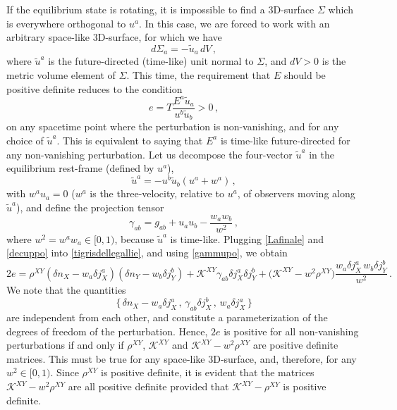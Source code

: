 \documentclass[a4paper, amsfonts, amssymb, amsmath, reprint, showkeys, nofootinbib, twoside, onecolumn,notitlepage]{revtex4-1}
\theoremstyle{definition}
\theoremstyle{theorem}
\begin{document}
If the equilibrium state is rotating, it is impossible to find a 3D-surface $\Sigma$ which is everywhere orthogonal to $u^a$. In this case, we are forced to work with an arbitrary space-like 3D-surface, for which we have
\begin{equation}
d\Sigma_a = -\tilde{u}_a \, dV \, ,
\end{equation}
where $\tilde{u}^a$ is the future-directed (time-like) unit normal to $\Sigma$, and $dV>0$ is the metric volume element of $\Sigma$. This time, the requirement that $E$ should be positive definite reduces to the condition
\begin{equation}\label{tigrisdellegallie}
e = T \dfrac{E^a \tilde{u}_a}{u^b \tilde{u}_b}  >0 \, ,
\end{equation}
on any spacetime point where the perturbation is non-vanishing, and for any choice of $\tilde{u}^a$. This is equivalent to saying that $E^a$ is time-like future-directed for any non-vanishing perturbation. Let us decompose the four-vector $\tilde{u}^a$ in the equilibrium rest-frame (defined by $u^a$),
\begin{equation}\label{decuppo}
\tilde{u}^a = -u^b\tilde{u}_b (u^a+w^a) \, ,
\end{equation}
with $w^a u_a=0$ ($w^a$ is the three-velocity, relative to $u^a$, of observers moving along $\tilde{u}^a$), and define the projection tensor
\begin{equation}\label{gammupo}
\gamma_{ab} = g_{ab}+u_a u_b - \dfrac{w_a w_b}{w^2} \, , 
\end{equation}
where $w^2=w^a w_a \in [0,1)$, because $\tilde{u}^a$ is time-like. Plugging \eqref{Lafinale} and \eqref{decuppo} into \eqref{tigrisdellegallie}, and using \eqref{gammupo}, we obtain
\begin{equation}
2e = \rho^{XY}(\delta n_X-w_a \delta j_X^a)(\delta n_Y-w_b \delta j_Y^b) + \mathcal{K}^{XY} \gamma_{ab} \delta j_X^a \delta j_Y^b +  \big( \mathcal{K}^{XY}-w^2 \rho^{XY} \big)\dfrac{w_a \delta j_X^a \, w_b \delta j^b_Y}{w^2} \, .
\end{equation}
We note that the quantities
\begin{equation}
\{ \, \delta n_X-w_a \delta j_X^a \, , \, \gamma_{ab}\delta j_X^b \, , \, w_a \delta j_X^a \, \}  
\end{equation}
are independent from each other, and constitute a parameterization of the degrees of freedom of the perturbation. Hence, $2e$ is positive for all non-vanishing perturbations if and only if $\rho^{XY}$, $\mathcal{K}^{XY}$ and $\mathcal{K}^{XY}-w^2 \rho^{XY}$ are positive definite matrices. This must be true for any space-like 3D-surface, and, therefore, for any $w^2 \in [0,1)$. Since $\rho^{XY}$ is positive definite, it is evident that the matrices $\mathcal{K}^{XY}-w^2 \rho^{XY}$ are all positive definite provided that $\mathcal{K}^{XY}-\rho^{XY}$ is positive definite.
\end{document}
